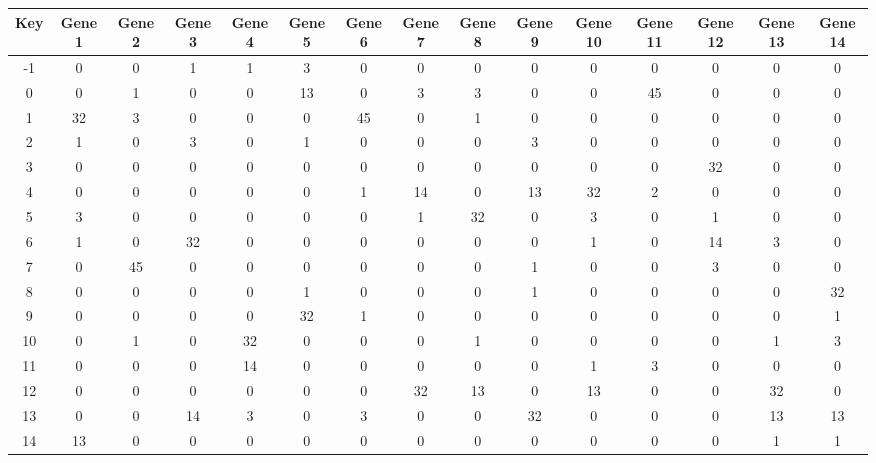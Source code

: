 \begin{tabular}{|c|c|c|c|c|c|c|c|c|c|c|c|c|c|c|}
\hline
Key & Gene 1 & Gene 2 & Gene 3 & Gene 4 & Gene 5 & Gene 6 & Gene 7 & Gene 8 & Gene 9 & Gene 10 & Gene 11 & Gene 12 & Gene 13 & Gene 14 \\
\hline
-1 & 0 & 0 & 1 & 1 & 3 & 0 & 0 & 0 & 0 & 0 & 0 & 0 & 0 & 0 \\
0 & 0 & 1 & 0 & 0 & 13 & 0 & 3 & 3 & 0 & 0 & 45 & 0 & 0 & 0 \\
1 & 32 & 3 & 0 & 0 & 0 & 45 & 0 & 1 & 0 & 0 & 0 & 0 & 0 & 0 \\
2 & 1 & 0 & 3 & 0 & 1 & 0 & 0 & 0 & 3 & 0 & 0 & 0 & 0 & 0 \\
3 & 0 & 0 & 0 & 0 & 0 & 0 & 0 & 0 & 0 & 0 & 0 & 32 & 0 & 0 \\
4 & 0 & 0 & 0 & 0 & 0 & 1 & 14 & 0 & 13 & 32 & 2 & 0 & 0 & 0 \\
5 & 3 & 0 & 0 & 0 & 0 & 0 & 1 & 32 & 0 & 3 & 0 & 1 & 0 & 0 \\
6 & 1 & 0 & 32 & 0 & 0 & 0 & 0 & 0 & 0 & 1 & 0 & 14 & 3 & 0 \\
7 & 0 & 45 & 0 & 0 & 0 & 0 & 0 & 0 & 1 & 0 & 0 & 3 & 0 & 0 \\
8 & 0 & 0 & 0 & 0 & 1 & 0 & 0 & 0 & 1 & 0 & 0 & 0 & 0 & 32 \\
9 & 0 & 0 & 0 & 0 & 32 & 1 & 0 & 0 & 0 & 0 & 0 & 0 & 0 & 1 \\
10 & 0 & 1 & 0 & 32 & 0 & 0 & 0 & 1 & 0 & 0 & 0 & 0 & 1 & 3 \\
11 & 0 & 0 & 0 & 14 & 0 & 0 & 0 & 0 & 0 & 1 & 3 & 0 & 0 & 0 \\
12 & 0 & 0 & 0 & 0 & 0 & 0 & 32 & 13 & 0 & 13 & 0 & 0 & 32 & 0 \\
13 & 0 & 0 & 14 & 3 & 0 & 3 & 0 & 0 & 32 & 0 & 0 & 0 & 13 & 13 \\
14 & 13 & 0 & 0 & 0 & 0 & 0 & 0 & 0 & 0 & 0 & 0 & 0 & 1 & 1 \\
\hline
\end{tabular}